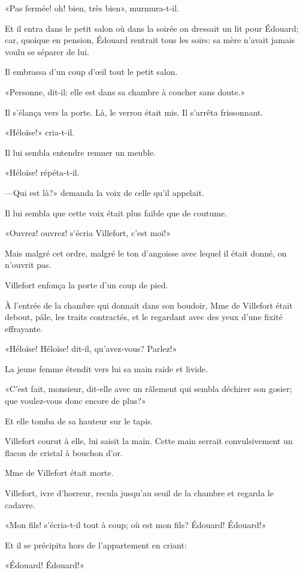 «Pas fermée! oh! bien, très bien», murmura-t-il. 

Et il entra dans le petit salon où dans la soirée on dressait un lit pour Édouard; car, quoique en pension, Édouard rentrait tous les soirs: sa mère n'avait jamais voulu se séparer de lui. 

Il embrassa d'un coup d'œil tout le petit salon. 

«Personne, dit-il; elle est dans sa chambre à coucher sans doute.» 

Il s'élança vers la porte. Là, le verrou était mis. Il s'arrêta frissonnant. 

«Héloïse!» cria-t-il. 

Il lui sembla entendre remuer un meuble. 

«Héloïse! répéta-t-il. 

—Qui est là?» demanda la voix de celle qu'il appelait. 

Il lui sembla que cette voix était plus faible que de coutume. 

«Ouvrez! ouvrez! s'écria Villefort, c'est moi!» 

Mais malgré cet ordre, malgré le ton d'angoisse avec lequel il était donné, on n'ouvrit pas. 

Villefort enfonça la porte d'un coup de pied. 

À l'entrée de la chambre qui donnait dans son boudoir, Mme de Villefort était debout, pâle, les traits contractés, et le regardant avec des yeux d'une fixité effrayante. 

«Héloïse! Héloïse! dit-il, qu'avez-vous? Parlez!» 

La jeune femme étendit vers lui sa main raide et livide. 

«C'est fait, monsieur, dit-elle avec un râlement qui sembla déchirer son gosier; que voulez-vous donc encore de plus?» 

Et elle tomba de sa hauteur sur le tapis. 

Villefort courut à elle, lui saisit la main. Cette main serrait convulsivement un flacon de cristal à bouchon d'or. 

Mme de Villefort était morte. 

Villefort, ivre d'horreur, recula jusqu'au seuil de la chambre et regarda le cadavre. 

«Mon fils! s'écria-t-il tout à coup; où est mon fils? Édouard! Édouard!» 

Et il se précipita hors de l'appartement en criant: 

«Édouard! Édouard!» 

